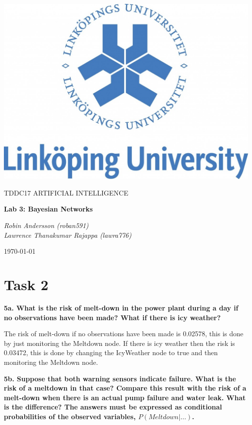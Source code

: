 \documentclass[a4paper,10pt]{article}
\begin{document}
\begin{titlepage}
	\centering
	\includegraphics[width=.6\textwidth]{liu-logo.png}\par
	\vfill
	{\scshape\Large TDDC17 ARTIFICIAL INTELLIGENCE\par}
	{\huge\bfseries Lab 3: Bayesian Networks\par}
	\vspace{1cm}
	{\large\itshape Robin Andersson (roban591) \\ Lawrence Thanakumar Rajappa (lawra776)\par}
	\vfill
	{\large \today\par}
\end{titlepage}

\section*{Task 2}

\textbf{5a. What is the risk of melt-down in the power plant during a day if no observations have been made? What if there is icy weather?}

The risk of melt-down if no observations have been made is 0.02578, this is done by just monitoring the Meltdown node.
If there is icy weather then the risk is 0.03472, this is done by changing the IcyWeather node to true and then monitoring the Meltdown node.

\textbf{5b. Suppose that both warning sensors indicate failure. 
What is the risk of a meltdown in that case? 
Compare this result with the risk of a melt-down when there is an actual pump failure and water leak. 
What is the difference? 
The answers must be expressed as conditional probabilities of the observed variables, $P(Meltdown | ...)$.}
\end{document}
